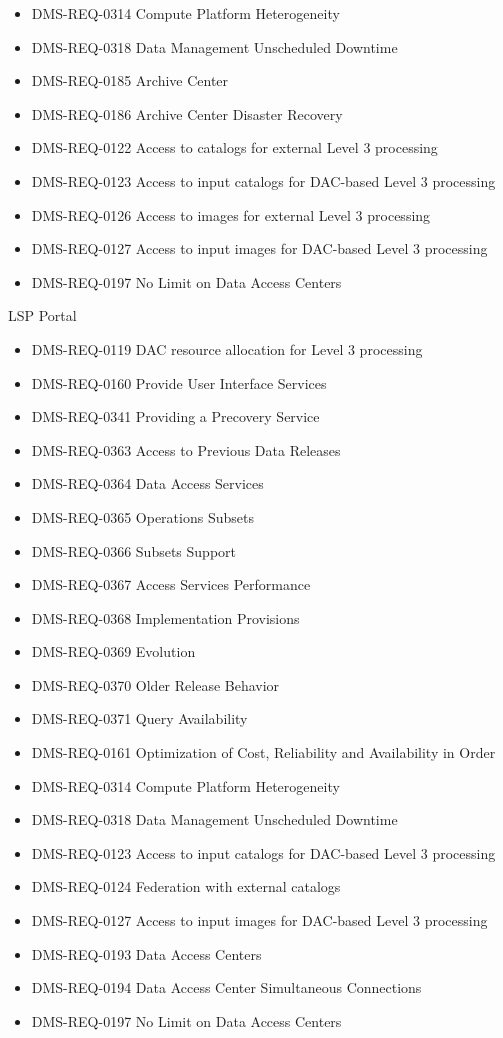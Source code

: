 \begin{itemize}
\item DMS-REQ-0314 Compute Platform Heterogeneity
\item DMS-REQ-0318 Data Management Unscheduled Downtime
\item DMS-REQ-0185 Archive Center
\item DMS-REQ-0186 Archive Center Disaster Recovery
\item DMS-REQ-0122 Access to catalogs for external Level 3 processing
\item DMS-REQ-0123 Access to input catalogs for DAC-based Level 3 processing
\item DMS-REQ-0126 Access to images for external Level 3 processing
\item DMS-REQ-0127 Access to input images for DAC-based Level 3 processing
\item DMS-REQ-0197 No Limit on Data Access Centers
\end{itemize}
LSP Portal \begin{itemize}
\item DMS-REQ-0119 DAC resource allocation for Level 3 processing
\item DMS-REQ-0160 Provide User Interface Services
\item DMS-REQ-0341 Providing a Precovery Service
\item DMS-REQ-0363 Access to Previous Data Releases
\item DMS-REQ-0364 Data Access Services
\item DMS-REQ-0365 Operations Subsets
\item DMS-REQ-0366 Subsets Support
\item DMS-REQ-0367 Access Services Performance
\item DMS-REQ-0368 Implementation Provisions
\item DMS-REQ-0369 Evolution
\item DMS-REQ-0370 Older Release Behavior
\item DMS-REQ-0371 Query Availability
\item DMS-REQ-0161 Optimization of Cost, Reliability and Availability in Order
\item DMS-REQ-0314 Compute Platform Heterogeneity
\item DMS-REQ-0318 Data Management Unscheduled Downtime
\item DMS-REQ-0123 Access to input catalogs for DAC-based Level 3 processing
\item DMS-REQ-0124 Federation with external catalogs
\item DMS-REQ-0127 Access to input images for DAC-based Level 3 processing
\item DMS-REQ-0193 Data Access Centers
\item DMS-REQ-0194 Data Access Center Simultaneous Connections
\item DMS-REQ-0197 No Limit on Data Access Centers
\end{itemize}
